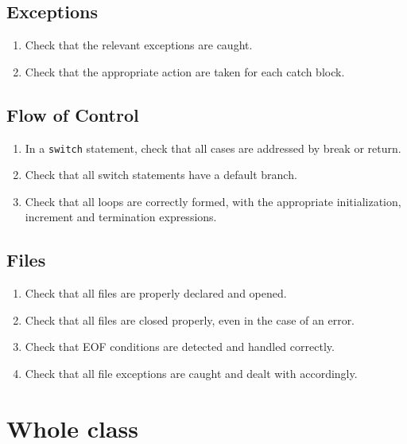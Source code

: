 \section{Exceptions}\begin{enumerate}[resume]
\item \label{item:X}Check that the relevant exceptions are caught.
\item \label{item:X}Check that the appropriate action are taken for each catch block.
\end{enumerate}

\section{Flow of Control}\begin{enumerate}[resume]
\item \label{item:X}In a \texttt{switch} statement, check that all cases are addressed by break or return.
\item \label{item:X}Check that all switch statements have a default branch.
\item \label{item:X}Check that all loops are correctly formed, with the appropriate initialization, increment and termination expressions.
\end{enumerate}

\section{Files}\begin{enumerate}[resume]
\item \label{item:X}Check that all files are properly declared and opened.
\item \label{item:X}Check that all files are closed properly, even in the case of an error.
\item \label{item:X}Check that EOF conditions are detected and handled correctly.
\item \label{item:X}Check that all file exceptions are caught and dealt with accordingly.
\end{enumerate}












\chapter{Whole class}

\inputminted{java}{"./java/SecurityMechanismSelector.java"}















